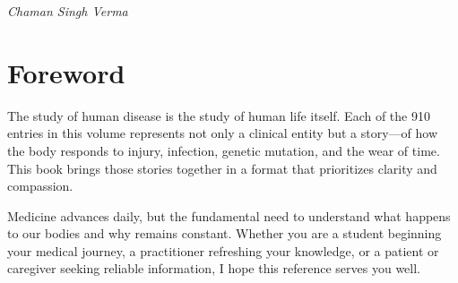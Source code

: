 \documentclass[12pt,a4paper,twoside]{book}
\begin{document}
\vspace{12pt}
\noindent
\emph{Chaman Singh Verma}

\bigskip

\chapter*{Foreword}

\noindent
The study of human disease is the study of human life itself. Each of the
910 entries in this volume represents not only a clinical entity but a
story---of how the body responds to injury, infection, genetic mutation, and
the wear of time. This book brings those stories together in a format that
prioritizes clarity and compassion.

\vspace{12pt}
\noindent
Medicine advances daily, but the fundamental need to understand what happens
to our bodies and why remains constant. Whether you are a student beginning
your medical journey, a practitioner refreshing your knowledge, or a patient
or caregiver seeking reliable information, I hope this reference serves you
well.

\mainmatter
\end{document}
